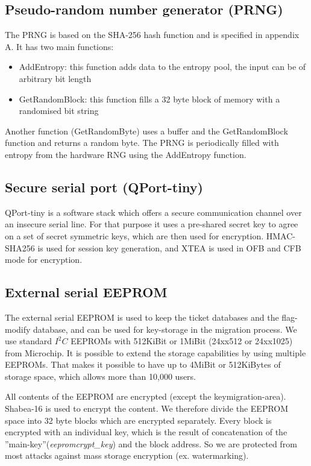 \subsection{Pseudo-random number generator (PRNG)}
The PRNG is based on the SHA-256 hash function and is specified in appendix A.
It has two main functions:
\begin{itemize}
 \item AddEntropy: this function adds data to the entropy pool, the input can be of arbitrary bit length
 \item GetRandomBlock: this function fills a 32 byte block of memory with a randomised bit string
\end{itemize}
Another function (GetRandomByte) uses a buffer and the GetRandomBlock function and returns a random byte.
The PRNG is periodically filled with entropy from the hardware RNG using the AddEntropy function.


\subsection{Secure serial port (QPort-tiny)}
QPort-tiny\cite{QPort-tiny} is a software stack which offers a secure communication channel over an insecure serial line. For that purpose it uses a pre-shared secret key to agree on a set of secret symmetric keys, which are then used for encryption. HMAC-SHA256 is used for session key generation, and XTEA\cite{XTEA} is used in OFB and CFB mode for encryption. 

\subsection{External serial EEPROM}
The external serial EEPROM is used to keep the ticket databases and the flag-modify database, and can be used for key-storage in the migration process. We use standard $I^2C$\cite{I2C} EEPROMs with 512KiBit or 1MiBit (24xx512\cite{24xx512} or 24xx1025\cite{24xx1025}) from Microchip\cite{microchip}. It is possible to extend the storage capabilities by using multiple EEPROMs. That makes it possible to have up to 4MiBit or 512KiBytes of storage space, which allows more than 10,000 users.

All contents of the EEPROM are encrypted (except the keymigration-area). Shabea-16 is used to encrypt the content. We therefore divide the EEPROM space into 32 byte blocks which are encrypted separately. Every block is encrypted with an individual key, which is the result of concatenation of the ''main-key''(\textit{eepromcrypt\_key}) and the block address. So we are protected from most attacks against mass storage encryption (ex. watermarking).

